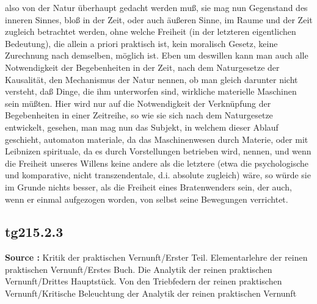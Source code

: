 \documentclass[a4paper,12pt,twoside]{book}
\begin{document}
also von der Natur überhaupt gedacht werden muß, sie mag nun Gegenstand des inneren Sinnes, bloß in der Zeit, oder auch äußeren Sinne, im Raume und der Zeit zugleich betrachtet werden, ohne welche Freiheit (in der letzteren eigentlichen Bedeutung), die allein a priori praktisch ist, kein moralisch Gesetz, keine Zurechnung nach demselben, möglich ist. Eben um deswillen kann man auch alle Notwendigkeit der Begebenheiten in der Zeit, nach dem Naturgesetze der Kausalität, den Mechanismus der Natur nennen, ob man gleich darunter nicht versteht, daß Dinge, die ihm unterworfen sind, wirkliche materielle Maschinen sein müßten. Hier wird nur auf die Notwendigkeit der Verknüpfung der Begebenheiten in einer Zeitreihe, so wie sie sich nach dem Naturgesetze entwickelt, gesehen, man mag nun das Subjekt, in welchem dieser Ablauf geschieht, automaton materiale, da das Maschinenwesen durch Materie, oder mit Leibnizen spirituale, da es durch Vorstellungen betrieben wird, nennen, und wenn die Freiheit unseres Willens keine andere als die letztere (etwa die psychologische und komparative, nicht transzendentale, d.i. absolute zugleich) wäre, so würde sie im Grunde nichts besser, als die Freiheit eines Bratenwenders sein, der auch, wenn er einmal aufgezogen worden, von selbst seine Bewegungen verrichtet. 
	
	\subsection*{tg215.2.3} 
	\textbf{Source : }Kritik der praktischen Vernunft/Erster Teil. Elementarlehre der reinen praktischen Vernunft/Erstes Buch. Die Analytik der reinen praktischen Vernunft/Drittes Hauptstück. Von den Triebfedern der reinen praktischen Vernunft/Kritische Beleuchtung der Analytik der reinen praktischen Vernunft\\  
	
\end{document}

